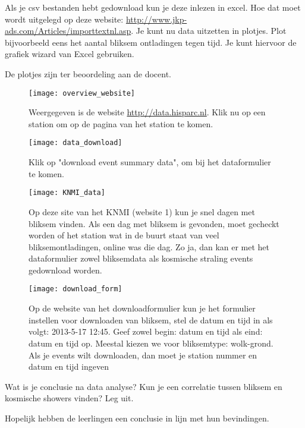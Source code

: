 \begin{questions}
\question 
Als je csv bestanden hebt gedownload kun je deze inlezen in excel. Hoe dat moet 
wordt uitgelegd op deze website: \url{ http://www.jkp-ads.com/Articles/importtextnl.asp}.
Je kunt nu data uitzetten in plotjes.
Plot bijvoorbeeld eens het aantal bliksem ontladingen tegen tijd.
Je kunt hiervoor de grafiek wizard van Excel gebruiken.
\begin{solution}
    De plotjes zijn ter beoordeling aan de docent. 
\end{solution}

\begin{figure}
    \centering
    \texttt{[image: overview\_website]}
    \caption{Weergegeven is de website \url{http://data.hisparc.nl}. 
    Klik nu op een station om op de pagina van 
    het station te komen.}
    \label{fig:overview_website}
\end{figure}

\begin{figure}
    \centering
    \texttt{[image: data\_download]}
    \caption{Klik op "download event summary data", om bij het dataformulier te komen.}
    \label{fig:data_download}
\end{figure}

\begin{figure}
    \centering
    \texttt{[image: KNMI\_data]}
    \caption{Op deze site van het KNMI (website 1) kun je snel dagen met bliksem vinden. Als een dag 
    met bliksem is gevonden, moet gecheckt worden of het \hisparc station wat in de
    buurt staat van veel bliksemontladingen, online was die dag. Zo ja, dan kan 
    er met het dataformulier zowel bliksemdata als kosmische straling events
    gedownload worden.}
    \label{fig:KNMI_data}
\end{figure}

\begin{figure}
    \centering
    \texttt{[image: download\_form]}
    \caption{Op de website van het downloadformulier kun je het formulier 
    instellen voor downloaden van bliksem, stel de datum en tijd in als volgt:
    2013-5-17 12:45. Geef zowel begin: datum en tijd als eind: datum en tijd op. Meestal 
    kiezen we voor bliksemtype: wolk-grond. Als je events wilt downloaden, dan 
    moet je station nummer en datum en tijd ingeven }
    \label{fig:download_form}
\end{figure}


\question 
Wat is je conclusie na data analyse? Kun je een correlatie tussen bliksem en
kosmische showers vinden? Leg uit.
\begin{solution}
    Hopelijk hebben de leerlingen een conclusie in lijn met hun bevindingen.
\end{solution}

\end{questions}

